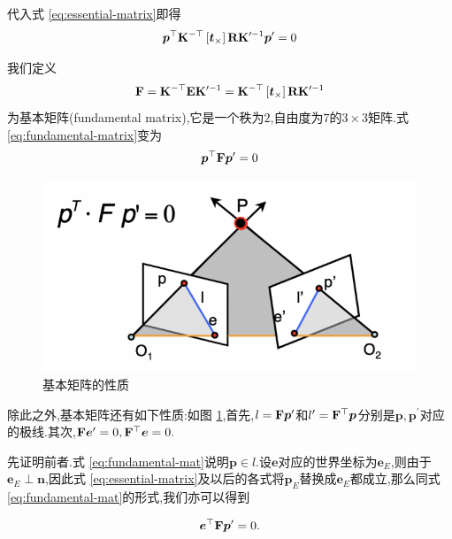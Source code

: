 代入式 \ref{eq:essential-matrix}即得
\begin{equation}
	\bm p^\top \bold{K}^{-\top} \left[ \bm t_{\times}\right]\bold{R} \bold{K}^{\prime-1} \bm p^{\prime} = 0
\end{equation}

我们定义
\begin{equation}
	\bold{F} = \bold{K}^{-\top} \bold{E} \bold{K}^{\prime-1} = \bold{K}^{-\top} \left[ \bm t_{\times}\right]\bold{R} \bold{K}^{\prime-1}
	\label{eq:fundamental-matrix}
\end{equation}
为基本矩阵(fundamental matrix),它是一个秩为$2$,自由度为$7$的$3 \times 3$矩阵.式 \ref{eq:fundamental-matrix}变为
\begin{equation}
	\bm p^\top \bold{F} \bm p^{\prime} = 0
	\label{eq:fundamental-mat}
\end{equation}


\begin{figure}
	\centering
	\includegraphics[scale=0.55]{figures/property-of-f-mat.png}
	\caption{基本矩阵的性质}
	\label{fig:property of fundamental matrix}
\end{figure}

除此之外,基本矩阵还有如下性质:如图 \ref{fig:property of fundamental matrix},首先,$l = \bold{F} \bm p^\prime$和$l^\prime = \bold{F}^{\top} \bm p$分别是$\bm p, \bm p^\prime$对应的极线.其次,$\bold{F} \bm e^\prime = 0, \bold{F}^\top \bm e = 0.$

先证明前者.式 \ref{eq:fundamental-mat}说明$\bm p \in l$.设$\bm e$对应的世界坐标为$\bm e_E$,则由于$\bm e_E \perp \bm n$,因此式 \ref{eq:essential-matrix}及以后的各式将$\bm p_E$替换成$\bm e_E$都成立,那么同式 \ref{eq:fundamental-mat}的形式,我们亦可以得到

\begin{equation}
	\bm e^\top \bold{F} \bm p^{\prime} = 0.
	\label{eq:all points in epipolar plane}
\end{equation}

